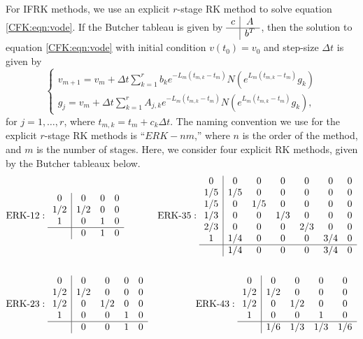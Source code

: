 \documentclass{csri19}
\begin{document}
For IFRK methods, we use an explicit $r$-stage RK method to solve 
equation \ref{CFK:eqn:vode}. If the Butcher tableau is given by 
$\begin{array}{c|c}
c & A \\ \hline & b^T \end{array}$, then the solution to equation \ref{CFK:eqn:vode} 
with initial condition $v(t_0) = v_0$ and step-size $\Delta t$ is given by
\[ \left\{\begin{array}{l} v_{m+1} = v_m + \Delta t\sum_{k=1}^r b_k 
                         e^{-L_m(t_{m,k}-t_m)}N(e^{L_m(t_{m,k}-t_m)}g_k) \\
          g_j = v_m + \Delta t \sum_{k=1}^r A_{j,k} e^{-L_m(t_{m,k} - t_m)} 
                      N(e^{L_m(t_{m,k}-t_m)}g_k), \end{array} \right. \]
for $j = 1,\dots,r$, where $t_{m,k} = t_m + c_k \Delta t$.
The naming convention we use for the explicit $r$-stage RK methods is ``$ERK
-nm$,'' where $n$ is the order of the method, and $m$ is the number of
stages. Here, we consider four explicit RK methods, given by the Butcher 
tableaux below.
\begin{align*}&\text{ERK-}12:
 \begin{array}{c|ccc}
0   & 0   & 0 & 0\\
1/2 & 1/2 & 0 & 0\\
1   & 0   & 1 & 0\\
\hline
    & 0   & 1 & 0
\end{array}
& \text{ERK-}35: 
\begin{array}{c|cccccc}
0   & 0   & 0   & 0   & 0   & 0   & 0\\
1/5 & 1/5 & 0   & 0   & 0   & 0   & 0\\
1/5 & 0   & 1/5 & 0   & 0   & 0   & 0\\
1/3 & 0   & 0   & 1/3 & 0   & 0   & 0\\
2/3 & 0   & 0   & 0   & 2/3 & 0   & 0\\
1   & 1/4 & 0   & 0   & 0   & 3/4 & 0\\
\hline
    & 1/4 & 0   & 0   & 0   & 3/4 & 0
\end{array}\\
\\
&\text{ERK-}23: 
\begin{array}{c|cccc}
0   & 0   & 0   & 0 & 0\\
1/2 & 1/2 & 0   & 0 & 0\\
1/2 & 0   & 1/2 & 0 & 0\\
1   & 0   & 0   & 1 & 0\\
\hline
    & 0   & 0   & 1 & 0
\end{array}
& \text{ERK-}43: 
\begin{array}{c|cccc}
0   & 0   & 0   & 0   & 0 \\
1/2 & 1/2 & 0   & 0   & 0 \\
1/2 & 0   & 1/2 & 0   & 0 \\
1   & 0   & 0   & 1   & 0 \\
\hline
    & 1/6 & 1/3 & 1/3 & 1/6
\end{array} 
\end{align*}
\end{document}

